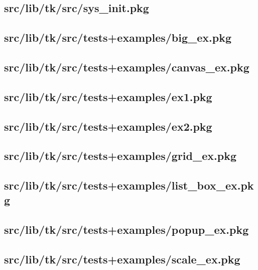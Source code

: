 \subsection{src/lib/tk/src/sys\_init.pkg}


\subsection{src/lib/tk/src/tests+examples/big\_ex.pkg}


\subsection{src/lib/tk/src/tests+examples/canvas\_ex.pkg}


\subsection{src/lib/tk/src/tests+examples/ex1.pkg}


\subsection{src/lib/tk/src/tests+examples/ex2.pkg}


\subsection{src/lib/tk/src/tests+examples/grid\_ex.pkg}


\subsection{src/lib/tk/src/tests+examples/list\_box\_ex.pkg}


\subsection{src/lib/tk/src/tests+examples/popup\_ex.pkg}


\subsection{src/lib/tk/src/tests+examples/scale\_ex.pkg}


